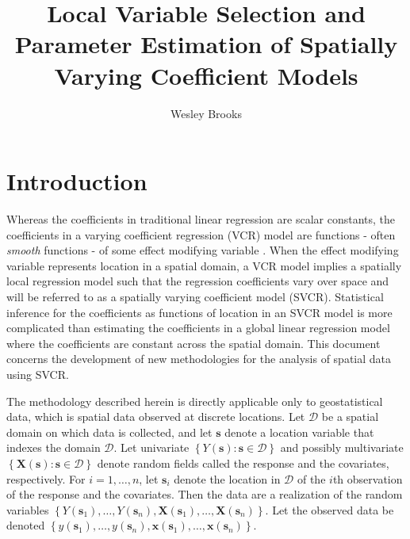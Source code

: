 \documentclass[authoryear, review, 11pt]{elsarticle}
\title{Local Variable Selection and Parameter Estimation of Spatially Varying Coefficient Models}
\author{Wesley Brooks}
\date{}                                           %
\begin{document}
\maketitle


\section{Introduction}
	Whereas the coefficients in traditional linear regression are scalar constants, the coefficients in a varying coefficient regression (VCR) model are functions - often \emph{smooth} functions - of some effect modifying variable \citep{Hastie:1993a}. When the effect modifying variable represents location in a spatial domain, a VCR model implies a spatially local regression model such that the regression coefficients vary over space and will be referred to as a spatially varying coefficient model (SVCR). Statistical inference for the coefficients as functions of location in an SVCR model is more complicated than estimating the coefficients in a global linear regression model where the coefficients are constant across the spatial domain. This document concerns the development of new methodologies for the analysis of spatial data using SVCR.
	
	The methodology described herein is directly applicable only to geostatistical data, which is spatial data observed at discrete locations. Let $\mathcal{D}$ be a spatial domain on which data is collected, and let $\bm{s}$ denote a location variable that indexes the domain $\mathcal{D}$. Let univariate $\left\{Y(\bm{s}) : \bm{s} \in \mathcal{D}\right\}$ and possibly multivariate $\left\{\bm{X}(\bm{s}) : \bm{s} \in \mathcal{D}\right\}$ denote random fields called the response and the covariates, respectively. For $i = 1, \dots, n$, let $\bm{s}_i$ denote the location in $\mathcal{D}$ of the $i$th observation of the response and the covariates. Then the data are a realization of the random variables $\left\{Y(\bm{s}_1), \dots, Y(\bm{s}_n), \bm{X}(\bm{s}_1), \dots, \bm{X}(\bm{s}_n)\right\}$. Let the observed data be denoted $\left\{y(\bm{s}_1), \dots, y(\bm{s}_n), \bm{x}(\bm{s}_1), \dots, \bm{x}(\bm{s}_n)\right\}$.
	
\end{document}
